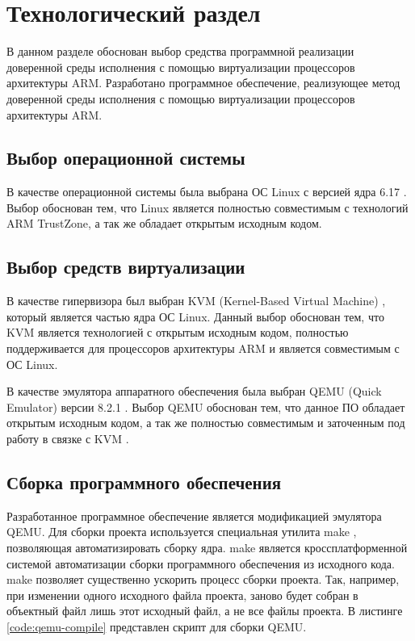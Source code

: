 \section{Технологический раздел}

В данном разделе обоснован выбор средства программной реализации доверенной среды исполнения с помощью виртуализации процессоров архитектуры ARM.
Разработано программное обеспечение, реализующее метод доверенной среды исполнения с помощью виртуализации процессоров архитектуры ARM.

\subsection{Выбор операционной системы}

В качестве операционной системы была выбрана ОС Linux с версией ядра 6.17 \cite{linux}. Выбор обоснован тем, что Linux является полностью совместимым с технологий ARM TrustZone, а так же обладает открытым исходным кодом.

\subsection{Выбор средств виртуализации}

В качестве гипервизора был выбран KVM (Kernel-Based Virtual Machine) \cite{kvm}, который является частью ядра ОС Linux. Данный выбор обоснован тем, что KVM является технологией с открытым исходным кодом, полностью поддерживается для процессоров архитектуры ARM и является совместимым с ОС Linux.

В качестве эмулятора аппаратного обеспечения была выбран QEMU (Quick Emulator) версии 8.2.1 \cite{qemu}. Выбор QEMU обоснован тем, что данное ПО обладает открытым исходным кодом, а так же полностью совместимым и заточенным под работу в связке с KVM \cite{kvm}.

\subsection{Сборка программного обеспечения}

Разработанное программное обеспечение является модификацией эмулятора QEMU. Для сборки проекта используется специальная утилита make \cite{make}, позволяющая автоматизировать сборку ядра. make является кроссплатформенной системой автоматизации сборки программного обеспечения из исходного кода. make позволяет существенно ускорить процесс сборки проекта. Так, например, при изменении одного исходного файла проекта, заново будет собран в объектный файл лишь этот исходный файл, а не все файлы проекта. В листинге \ref{code:qemu-compile} представлен скрипт для сборки QEMU.

